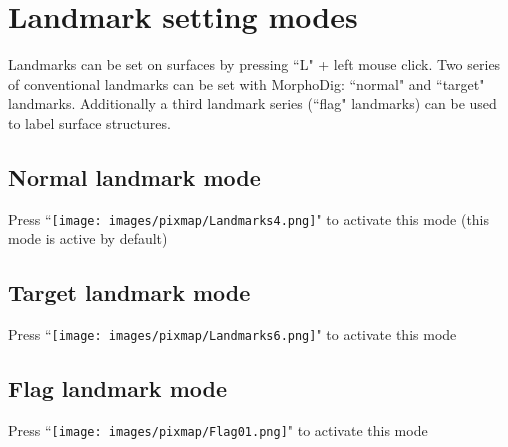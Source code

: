 \section{Landmark setting modes}
Landmarks can be set on surfaces by pressing ``L" + left mouse click. 
Two series of conventional landmarks can be set with MorphoDig: ``normal" and ``target" landmarks. Additionally a third landmark series (``flag" landmarks) can be used to label surface structures. 
\subsection{Normal landmark mode}	
Press ``\texttt{[image: images/pixmap/Landmarks4.png]}" to activate this mode (this mode is active by default)
\subsection{Target landmark mode}	

Press ``\texttt{[image: images/pixmap/Landmarks6.png]}"  to activate this mode
\subsection{Flag landmark mode}	

Press ``\texttt{[image: images/pixmap/Flag01.png]}" to activate this mode
